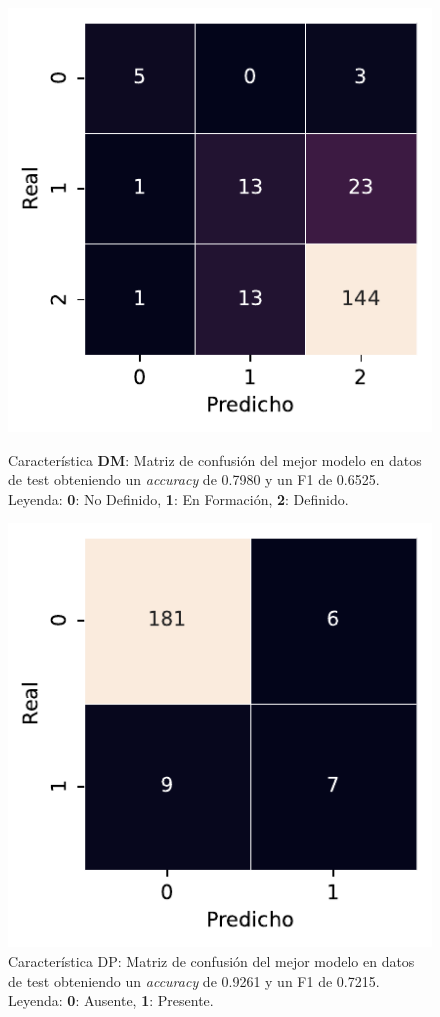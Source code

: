 \begin{figure}[htbp]
    \includegraphics[width=0.4\linewidth]{figures/5_experiments/multi-dm-cm.pdf}
    \caption[Característica DM: Matriz de confusión del mejor modelo en datos de test.]{Característica \textbf{DM}: Matriz de confusión del mejor modelo en datos de test obteniendo un \textit{accuracy} de 0.7980 y un F1 de 0.6525. Leyenda: \textbf{0}: No Definido, \textbf{1}: En Formación, \textbf{2}: Definido.}
    \label{fig5:DM_confusion_matrix}
    \includegraphics[width=0.4\linewidth]{figures/5_experiments/multi-dp-cm.pdf}
    \caption[Característica DP: Matriz de confusión del mejor modelo en datos de test.]{Característica DP: Matriz de confusión del mejor modelo en datos de test obteniendo un \textit{accuracy} de 0.9261 y un F1 de 0.7215. Leyenda: \textbf{0}: Ausente, \textbf{1}: Presente.}
    \label{fig5:DP_confusion_matrix}
\end{figure}

